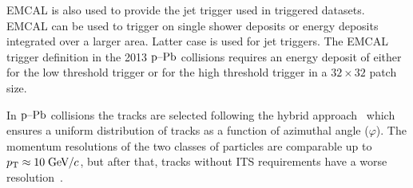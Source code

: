 
EMCAL is also used to provide the jet trigger used in triggered datasets. EMCAL can be used to trigger on single shower deposits or energy deposits integrated over a larger area. Latter case is used for jet triggers. The EMCAL trigger definition in the 2013 $\mbox{p--Pb}$ collisions requires an energy deposit of either \unit[10]{\gev}  for the low threshold trigger or \unit[20]{\gev} for the high threshold trigger in a $32\times32$ patch size.


In $\mbox{p--Pb}$ collisions the tracks are selected following the hybrid approach~\cite{hybridExplanation} which ensures a uniform distribution of tracks as a function of azimuthal angle ($\varphi$). The momentum resolutions of the two classes of particles are comparable up to $p_{\rm T} \approx 10\;\mathrm{GeV}\kern-0.05em/\kern-0.02em c$, but after that, tracks without ITS requirements have a worse resolution~\cite{alicePerformance,aliceBackgroundFluctuation}.

